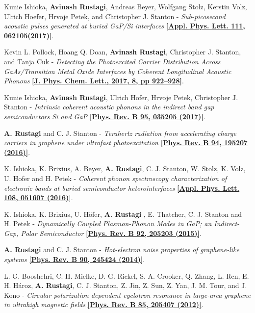 \documentclass[12pt]{article}
\begin{document}
\begin{etaremune}
	\item Kunie Ishioka, {\bf Avinash Rustagi}, Andreas Beyer, Wolfgang Stolz, Kerstin Volz, Ulrich Hoefer, Hrvoje Petek, and Christopher J. Stanton - \textit{Sub-picosecond acoustic pulses generated at buried GaP/Si interfaces} \href{http://aip.scitation.org/doi/full/10.1063/1.4997913}{\bf  [Appl. Phys. Lett. 111, 062105(2017)]}.
 
	\item Kevin L. Pollock, Hoang Q. Doan, {\bf Avinash Rustagi}, Christopher J. Stanton, and Tanja Cuk - \textit{Detecting the Photoexcited Carrier Distribution Across GaAs/Transition Metal Oxide Interfaces by Coherent Longitudinal Acoustic Phonons} \href{http://pubs.acs.org/doi/abs/10.1021/acs.jpclett.6b02835} {\bf [J. Phys. Chem. Lett., 2017, 8, pp 922–928]}.

       \item Kunie Ishioka, {\bf Avinash Rustagi}, Ulrich Hofer, Hrvoje Petek, Christopher J. Stanton - \textit{Intrinsic coherent acoustic phonons in the indirect band gap semiconductors Si and GaP} \href{http://journals.aps.org/prb/abstract/10.1103/PhysRevB.95.035205} {\bf [Phys. Rev. B 95, 035205 (2017)]}.

			\item {\bf A. Rustagi} and C. J. Stanton - \textit{Terahertz radiation from accelerating charge carriers in graphene under ultrafast photoexcitation} \href{https://journals.aps.org/prb/abstract/10.1103/PhysRevB.94.195207} {\bf [Phys. Rev. B 94, 195207 (2016)]}.

      \item K. Ishioka, K. Brixius, A. Beyer, {\bf A. Rustagi}, C. J. Stanton, W. Stolz, K. Volz, U. Hofer and H. Petek - \textit{Coherent phonon spectroscopy characterization of electronic bands at buried semiconductor heterointerfaces} \href{http://scitation.aip.org/content/aip/journal/apl/108/5/10.1063/1.4941397} {\bf [Appl. Phys. Lett. 108, 051607 (2016)]}.

     \item K. Ishioka, K. Brixius, U. H{\"o}fer, {\bf A. Rustagi} , E. Thatcher, C. J. Stanton and H. Petek - \textit{Dynamically Coupled Plasmon-Phonon Modes in GaP; an Indirect-Gap, Polar Semiconductor} \href{http://journals.aps.org/prb/abstract/10.1103/PhysRevB.92.205203}{\bf [Phys. Rev. B 92, 205203 (2015)]}.

     \item {\bf A. Rustagi} and C. J. Stanton - \textit{Hot-electron noise properties of graphene-like systems} \href{http://journals.aps.org/prb/abstract/10.1103/PhysRevB.90.245424}{\bf [Phys. Rev. B 90, 245424 (2014)]}.

    \item L. G. Booshehri, C. H. Mielke, D. G. Rickel, S. A. Crooker, Q. Zhang, L. Ren, E. H. Hároz, {\bf A. Rustagi}, C. J. Stanton, Z. Jin, Z. Sun, Z. Yan, J. M. Tour, and J. Kono - \textit{Circular polarization dependent cyclotron resonance in large-area graphene in ultrahigh magnetic fields} \href{http://journals.aps.org/prb/abstract/10.1103/PhysRevB.85.205407} {\bf [Phys. Rev. B 85, 205407 (2012)]}.

\end{etaremune}
\end{document}

